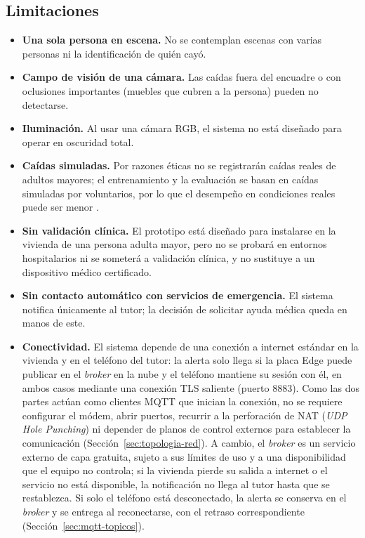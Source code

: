 \documentclass[12pt,a4paper,oneside]{book}
\theoremstyle{plain}
\theoremstyle{definition}
\theoremstyle{remark}
\begin{document}
\subsection{Limitaciones}
\label{sec:limitaciones}
\begin{itemize}
  \item \textbf{Una sola persona en escena.} No se contemplan escenas con varias personas ni la identificación de quién cayó.
  \item \textbf{Campo de visión de una cámara.} Las caídas fuera del encuadre o con oclusiones importantes (muebles que cubren a la persona) pueden no detectarse.
  \item \textbf{Iluminación.} Al usar una cámara RGB, el sistema no está diseñado para operar en oscuridad total.
  \item \textbf{Caídas simuladas.} Por razones éticas no se registrarán caídas reales de adultos mayores; el entrenamiento y la evaluación se basan en caídas simuladas por voluntarios, por lo que el desempeño en condiciones reales puede ser menor \parencite{igual2013challenges}.
  \item \textbf{Sin validación clínica.} El prototipo está diseñado para instalarse en la vivienda de una persona adulta mayor, pero no se probará en entornos hospitalarios ni se someterá a validación clínica, y no sustituye a un dispositivo médico certificado.
  \item \textbf{Sin contacto automático con servicios de emergencia.} El sistema notifica únicamente al tutor; la decisión de solicitar ayuda médica queda en manos de este.
  \item \textbf{Conectividad.} El sistema depende de una conexión a internet estándar en la vivienda y en el teléfono del tutor: la alerta solo llega si la placa Edge puede publicar en el \textit{broker} en la nube y el teléfono mantiene su sesión con él, en ambos casos mediante una conexión TLS saliente (puerto 8883). Como las dos partes actúan como clientes MQTT que inician la conexión, no se requiere configurar el módem, abrir puertos, recurrir a la perforación de NAT (\textit{UDP Hole Punching}) ni depender de planos de control externos para establecer la comunicación (Sección~\ref{sec:topologia-red}). A cambio, el \textit{broker} es un servicio externo de capa gratuita, sujeto a sus límites de uso y a una disponibilidad que el equipo no controla; si la vivienda pierde su salida a internet o el servicio no está disponible, la notificación no llega al tutor hasta que se restablezca. Si solo el teléfono está desconectado, la alerta se conserva en el \textit{broker} y se entrega al reconectarse, con el retraso correspondiente (Sección~\ref{sec:mqtt-topicos}).

\end{itemize}
\end{document}

